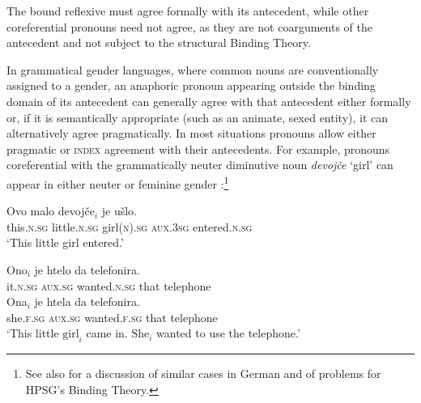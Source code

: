 \documentclass[output=paper,biblatex,babelshorthands,newtxmath,draftmode,colorlinks,citecolor=brown]{langscibook}
\begin{document}
\begin{exe}
\ex   \label{lurch}
\begin{xlist}
\end{xlist}
\end{exe}

\noindent
The bound reflexive must agree formally with its antecedent, while other
coreferential pronouns need not agree, as they are not coarguments of the antecedent and not subject to the structural Binding Theory.  

In grammatical gender languages, where common nouns are conventionally assigned to a gender, an anaphoric pronoun appearing outside the binding domain of its antecedent can generally agree with that antecedent either formally or, if it is semantically appropriate (such as an animate, sexed entity), it can alternatively agree pragmatically.  In most situations pronouns allow either pragmatic or \textsc{index} agreement with their
antecedents.  For example, pronouns coreferential with the  grammatically neuter diminutive noun \textit{devojče} `girl' can appear in either neuter or feminine gender \citep[from][198]{Wechsler+Zlatic:2003}:\footnote{
See also  for a discussion of similar cases in German and of problems for HPSG's Binding Theory.
}

\begin{exe}
\ex \label{girl}
\gll Ovo	        malo                 devojče$_i$                  je               ušlo.  \\
     this.\textsc{n.sg} little.\textsc{n.sg} girl(\textsc{n}).\textsc{sg} \textsc{aux.3sg} entered.\textsc{n.sg}  \\
\glt `This little girl entered.'
\begin{xlist}
\ex  
\gll Ono$_i$	      je	      htelo	           da	telefonira. \\
     it.\textsc{n.sg} \textsc{aux.sg} wanted.\textsc{n.sg} that	telephone   \\
\ex  
\gll Ona$_i$	je	htela	da	telefonira. \\
     she.\textsc{f.sg}  	\textsc{aux.sg}  	wanted.\textsc{f.sg}  	that	telephone \\
\glt `This little $\mbox{girl}_i$ came in.  $\mbox{She}_i$ wanted to use the telephone.'
\end{xlist}
\end{exe}
\end{document}
